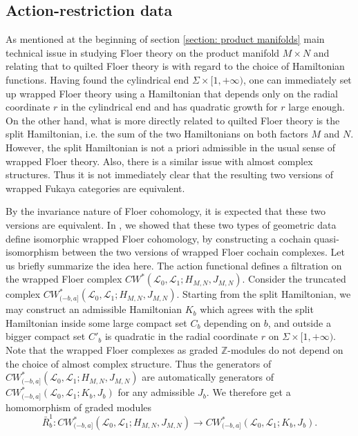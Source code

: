 \documentclass{amsart}
\numberwithin{equation}{section}
\numberwithin{figure}{section}
\begin{document}
\subsection{Action-restriction data}
	As mentioned at the beginning of section \ref{section: product manifolds} main technical issue in studying Floer theory on the product manifold $M \times N$ and relating that to quilted Floer theory is with regard to the choice of Hamiltonian functions. Having found the cylindrical end $\Sigma \times [1, +\infty)$, one can immediately set up wrapped Floer theory using a Hamiltonian that depends only on the radial coordinate $r$ in the cylindrical end and has quadratic growth for $r$ large enough. On the other hand, what is more directly related to quilted Floer theory is the split Hamiltonian, i.e. the sum of the two Hamiltonians on both factors $M$ and $N$. However, the split Hamiltonian is not a priori admissible in the usual sense of wrapped Floer theory. Also, there is a similar issue with almost complex structures. Thus it is not immediately clear that the resulting two versions of wrapped Fukaya categories are equivalent. \par
	By the invariance nature of Floer cohomology, it is expected that these two versions are equivalent. In \cite{Gao1}, we showed that these two types of geometric data define isomorphic wrapped Floer cohomology, by constructing a cochain quasi-isomorphism between the two versions of wrapped Floer cochain complexes. Let us briefly summarize the idea here. The action functional defines a filtration on the wrapped Floer complex $CW^{*}(\mathcal{L}_{0}, \mathcal{L}_{1}; H_{M, N}, J_{M, N})$. Consider the truncated complex $CW^{*}_{(-b, a]}(\mathcal{L}_{0}, \mathcal{L}_{1}; H_{M, N}, J_{M, N})$. Starting from the split Hamiltonian, we may construct an admissible Hamiltonian $K_{b}$ which agrees with the split Hamiltonian inside some large compact set $C_{b}$ depending on $b$, and outside a bigger compact set $C'_{b}$ is quadratic in the radial coordinate $r$ on $\Sigma \times [1, +\infty)$. Note that the wrapped Floer complexes as graded $\mathbb{Z}$-modules do not depend on the choice of almost complex structure. Thus the generators of $CW^{*}_{(-b, a]}(\mathcal{L}_{0}, \mathcal{L}_{1}; H_{M, N}, J_{M, N})$ are automatically generators of $CW^{*}_{(-b, a]}(\mathcal{L}_{0}, \mathcal{L}_{1}; K_{b}, J_{b})$ for any admissible $J_{b}$. We therefore get a homomorphism of graded modules
\begin{equation} \label{action-restriction map}
\bar{R}^{1}_{b}: CW^{*}_{(-b, a]}(\mathcal{L}_{0}, \mathcal{L}_{1}; H_{M, N}, J_{M, N}) \to CW^{*}_{(-b, a]}(\mathcal{L}_{0}, \mathcal{L}_{1}; K_{b}, J_{b}).
\end{equation} \par
\end{document}
